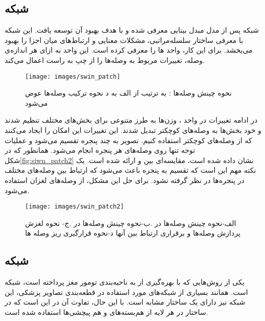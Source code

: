 \subsection{ شبکه }
شبکه  پس از مدل مبدل بینایی معرفی شده و با هدف بهبود آن توسعه یافت. این شبکه با معرفی ساختار سلسله‌مراتبی، مشکلات معنایی و ارتباط‌های میان اجزا را بهبود می‌بخشد. برای این کار، واحد ها را معرفی کرده است. این واحد به ازای هر اندازه‌ی وصله، تغییرات مربوط به وصله‌ها را از چپ به راست اعمال می‌کند.

\begin{figure}[h]
\centerline{\texttt{[image: images/swin\_patch]}}
\caption[\hspace{0.5em}نحوه چینش وصله ها در ]{نحوه چینش وصله‌ها : به ترتیب از الف به د نحوه ترکیب وصله‌ها عوض می‌شود\cite{liu2021swin}}
\label{fig:swin_patch}
\end{figure}
در ادامه تغییرات در واحد  ، وزن‌ها به طرز متنوعی برای بخش‌های مختلف تنظیم شدند و خود بخش‌ها به وصله‌های کوچکتر تبدیل شدند. این تغییرات این امکان را ایجاد می‌کنند که از وصله‌های کوچکتر استفاده کنیم. تصویر به چند پنجره تقسیم می‌شود و عملیات توجه تنها روی وصله‌های هر پنجره انجام می‌شود. همانطور که در شکل\ref{fig:siwn_patch2} نشان داده شده است، مقایسه‌ای بین  و  ارائه شده است. یک نکته مهم این است که تقسیم به پنجره باعث می‌شود که ارتباط بین ‌وصله‌های مختلف در پنجره‌ها در نظر گرفته نشود. برای حل این مشکل، از وصله‌های لغزان استفاده می‌شود\cite{liu2021swin}.

\begin{figure}[h]
\centerline{\texttt{[image: images/swin\_patch2]}}
\caption[\hspace{0.5em}وصله ها در ]{    الف-نحوه چینش وصله‌ها در  .ب-نحوه چینش وصله‌ها در  .ج- نحوه لغزش پردازش وصله‌ها و برقراری ارتباط بین آنها د-نحوه قرارگیری ریز وصله ها\cite{liu2021swin}}
\begin{center}
\end{center}
\label{fig:swin_patch2}
\end{figure}

\subsection{ شبکه }
یکی از روش‌هایی که با بهره‌گیری از  به ناحیه‌بندی تومور مغز پرداخته است، شبکه  است.
همانند بسیاری از شبکه‌های مورد استفاده در قطعه‌بندی تصاویر پزشکی، این شبکه نیز دارای یک ساختار مشابه  است. با این حال، تفاوت آن در این است که در ساختار  در هر لایه از هم‌بسته‌های  و هم پیچشی‌ها استفاده شده است.

